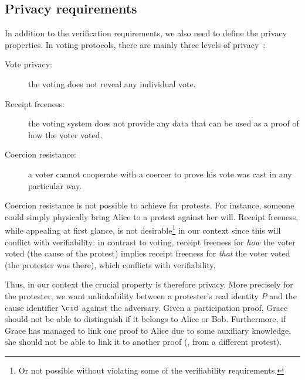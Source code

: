 \subsection{Privacy requirements}%
\label{privacy-properties}

In addition to the verification requirements, we also need to define the privacy properties.
In voting protocols, there are mainly three levels of privacy~\cite{VerifyingPrivacyPropertiesOfVotingProtocols}:
\begin{description}
  \item[Vote privacy:] the voting does not reveal any individual vote.
  \item[Receipt freeness:] the voting system does not provide any data that can be used as a proof of how the voter voted.
  \item[Coercion resistance:] a voter cannot cooperate with a coercer to prove his vote was cast in any particular way.
\end{description}

Coercion resistance is not possible to achieve for protests.
For instance, someone could simply physically bring Alice to a protest against her will.
Receipt freeness, while appealing at first glance, is not desirable\footnote{%
  Or not possible without violating some of the verifiability 
  requirements.
} in our context since this will conflict with verifiability: in contrast to 
voting, receipt freeness for \emph{how} the voter voted (\ie the cause of the 
protest) implies receipt freeness for \emph{that} the voter voted (\ie the 
protester was there), which conflicts with verifiability.

Thus, in our context the crucial property is therefore privacy.
More precisely for the protester, we want unlinkability between a protester's real identity \(P\) and the cause identifier \(\cid\) against the adversary.
Given a participation proof, Grace should not be able to distinguish if it belongs to Alice or Bob.
Furthermore, if Grace has managed to link one proof to Alice due to some auxiliary knowledge, she should not be able to link it to another proof (\eg, from a different protest).


